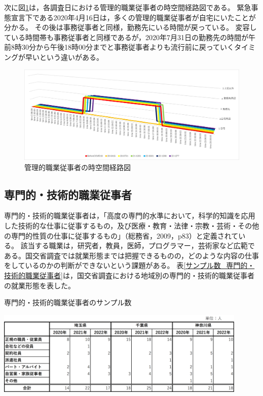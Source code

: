 \documentclass[paper={210mm,297mm},fontsize=15Q,line_length=35zw,number_of_lines=31,head_space=30mm,gutter=40mm,baselineskip=2.0zw,headfoot_verticalposition=1.5zw]{jlreq}
\begin{document}
次に図\ref{時空間経路図_管理的職業従事者}は，各調査日における管理的職業従事者の時空間経路図である。
緊急事態宣言下である2020年4月16日は，多くの管理的職業従事者が自宅にいたことが分かる。
その後は事務従事者と同様，勤務先にいる時間が戻っている。
変容している時間帯も事務従事者と同様であるが，2020年7月31日の勤務先の時間が午前8時30分から午後18時00分までと事務従事者よりも流行前に戻っていくタイミングが早いという違いがある。

\begin{figure}[H]
  \centering
  \includegraphics[scale=0.4]{../Figure/c04s02_fig_時空間経路図_管理的職業従事者.png}
  \caption{管理的職業従事者の時空間経路図}
  \label{時空間経路図_管理的職業従事者}
\end{figure}

\subsection{専門的・技術的職業従事者}

専門的・技術的職業従事者は，「高度の専門的水準において，科学的知識を応用した技術的な仕事に従事するもの，及び医療・教育・法律・宗教・芸術・その他の専門的性質の仕事に従事するもの」（総務省，2009，p83）と定義されている。
該当する職業は，研究者，教員，医師，プログラマー，芸術家など広範である。国交省調査では就業形態までは把握できるものの，どのような内容の仕事をしているのかの判断ができないという課題がある。
表\ref{サンプル数_専門的・技術的職業従事者}は，国交省調査における地域別の専門的・技術的職業従事者の就業形態を表した。

\begin{table}[H]
  \centering
  \caption{専門的・技術的職業従事者のサンプル数}
  \includegraphics[width=120mm]{../Figure/c04s03_table_専門的・技術的職業従事者_サンプル数.png}
  \label{サンプル数_専門的・技術的職業従事者}
\end{table}
\end{document}
